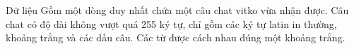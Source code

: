 Dữ liệu
Gồm một dòng duy nhất chứa một câu chat vitko vừa nhận được. Câu chat có độ dài không vượt quá 255 ký tự, chỉ gồm các ký tự latin in thường, khoảng trắng và các dấu câu. Các từ được cách nhau đúng một khoảng trắng.